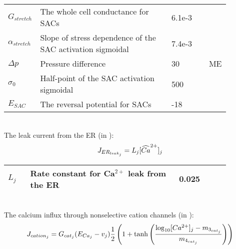 %
\begin{table}[h!]
\centering
\begin{tabular}{| p{0.09\linewidth} | >{\footnotesize} p{0.6\linewidth} | >{\footnotesize} p{0.17\linewidth} | >{\footnotesize} p{0.02\linewidth} |}
\arrayrulecolor{lightgrey}\hline
$G_{stretch}$      		& The whole cell conductance for SACs						& 6.1e-3 \uMpmVs	&\cite{Koenigsberger2006} \\
$\alpha_{stretch}$      & Slope of stress dependence of the SAC activation sigmoidal	& 7.4e-3 \pmmHg	&\cite{Koenigsberger2006} \\
$ \Delta p $			& Pressure difference										& 30 \mmHg			& ME \\
$\sigma_{0}$      		& Half-point of the SAC activation sigmoidal				& 500 \mmHg			&\cite{Koenigsberger2006} \\
$E_{SAC}$      			& The reversal potential for SACs							& -18 \mV			&\cite{Koenigsberger2006} \\
\hline
\end{tabular}
\label{tab:Jstretchj}
\end{table}
\\
%
The leak current from the ER (in \uMs):
\begin{equation} \label{eq:JERleakj}
J_{ER_{leak_{j}}} = L_{j}[\widehat{Ca}^{2+}]_{j}
\end{equation}
%
\begin{table}[h!]
\centering
\begin{tabular}{| p{0.09\linewidth} | >{\footnotesize} p{0.6\linewidth} | >{\footnotesize} p{0.17\linewidth} | >{\footnotesize} p{0.02\linewidth} |}
\arrayrulecolor{lightgrey}\hline
$L_{j}$      			& Rate constant for Ca$^{2+}$ leak from the ER 		 & 0.025	\pers			& \cite{Koenigsberger2006} \\
\hline
\end{tabular}
\label{tab:JERleakj}
\end{table}
\\
%
The calcium influx through nonselective cation channels (in \uMs):
\begin{equation} \label{eq:Jcationj}
J_{cation_{j}} = G_{cat_{j}} (E_{Ca_{j}} - v_{j}) \frac{1}{2} \left(   1+ \mathrm{tanh}  \left(  \frac{\mathrm{log}_{10} [Ca^{2+}]_{j} - m_{3_{cat_{j}}} }    {m_{4_{cat_{j}}}}   \right)      \right) 
\end{equation}
%
%
